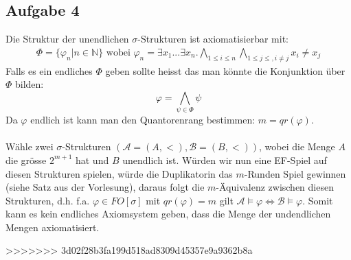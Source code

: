 \documentclass[a4paper,10pt]{article}
\newcommand{\N}{\mathbb{N}}
\begin{document}
\subsection*{Aufgabe 4}
Die Struktur der unendlichen $\sigma$-Strukturen ist axiomatisierbar mit:
\begin{align*}
	\Phi = \{\varphi_n | n \in \N \} \text{ wobei } \varphi_n = \exists x_1 ... \exists x_n. \bigwedge_{1  \le i \le n} \bigwedge_{1 \le j \le, i \neq j} x_i \neq x_j
\end{align*}
Falls es ein endliches $\Phi$ geben sollte heisst das man könnte die Konjunktion über $\Phi$ bilden:
\[\varphi = \bigwedge_{\psi \in \Phi} \psi \]
Da $\varphi$ endlich ist kann man den Quantorenrang bestimmen: $m = qr(\varphi)$. \\
\\
Wähle zwei $\sigma$-Strukturen $(\mathcal{A} = (A,<),\mathcal{B} = (B,<))$, wobei die Menge $A$ die grösse $2^{m+1}$ hat und $B$ unendlich ist. Würden wir nun eine EF-Spiel auf diesen Strukturen spielen, würde die Duplikatorin das $m$-Runden Spiel gewinnen (siehe Satz aus der Vorlesung), daraus folgt die $m$-Äquivalenz zwischen diesen Strukturen, d.h. f.a. $\varphi \in FO[\sigma] $ mit $qr(\varphi) = m$ gilt $\mathcal{A} \vDash \varphi \Leftrightarrow \mathcal{B} \vDash \varphi$. Somit kann es kein endliches Axiomsystem geben, dass die Menge der undendlichen Mengen axiomatisiert.


>>>>>>> 3d02f28b3fa199d518ad8309d45357e9a9362b8a
\end{document}
